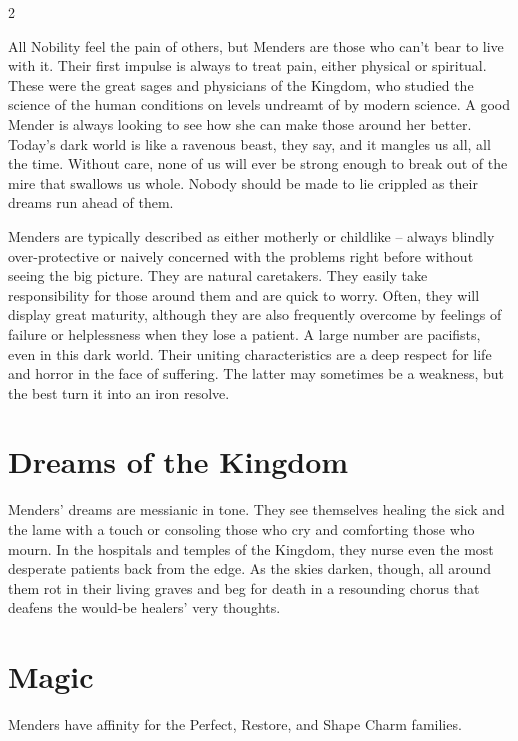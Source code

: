 \label{scha:Mender}\begin{multicols}{2}\raggedcolumns

\noindent All Nobility feel the pain of others, but Menders are those who can't bear to live with it. Their first impulse is always to treat pain, either physical or spiritual. These were the great sages and physicians of the Kingdom, who studied the science of the human conditions on levels undreamt of by modern science. A good Mender is always looking to see how she can make those around her better. Today's dark world is like a ravenous beast, they say, and it mangles us all, all the time. Without care, none of us will ever be strong enough to break out of the mire that swallows us whole. Nobody should be made to lie crippled as their dreams run ahead of them.

Menders are typically described as either motherly or childlike – always blindly over-protective or naively concerned with the problems right before without seeing the big picture. They are natural caretakers. They easily take responsibility for those around them and are quick to worry. Often, they will display great maturity, although they are also frequently overcome by feelings of failure or helplessness when they lose a patient. A large number are pacifists, even in this dark world. Their uniting characteristics are a deep respect for life and horror in the face of suffering. The latter may sometimes be a weakness, but the best turn it into an iron resolve. 

\section*{Dreams of the Kingdom}

Menders' dreams are messianic in tone. They see themselves healing the sick and the lame with a touch or consoling those who cry and comforting those who mourn. In the hospitals and temples of the Kingdom, they nurse even the most desperate patients back from the edge. As the skies darken, though, all around them rot in their living graves and beg for death in a resounding chorus that deafens the would-be healers' very thoughts. 

\section*{Magic}

Menders have affinity for the Perfect, Restore, and Shape Charm families.


\end{multicols}
